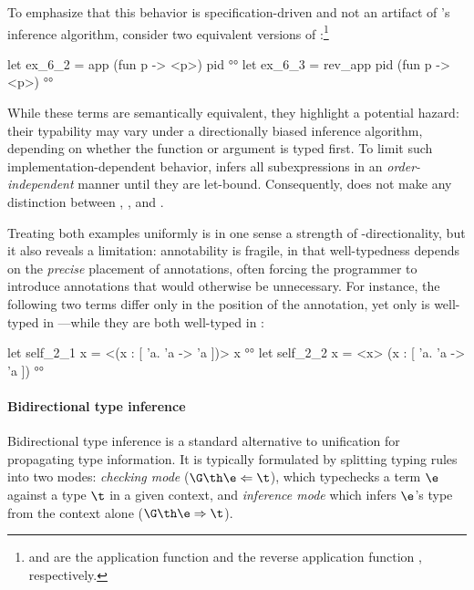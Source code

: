 \documentclass[acmsmall,screen,nonacm%
\Anonymous{,anonymous}{}%
\Final{}{,review}%
]{acmart}
\providecommand{\DIFdel}[1]{\protect\cbdelete{\protect\color{red}#1}\protect\cbdelete} %
\providecommand{\DIFaddbegin}{} %
\providecommand{\DIFaddend}{} %
\providecommand{\DIFdelbegin}{} %
\providecommand{\DIFdelend}{} %
\begin{document}
To emphasize that this behavior is specification-driven and not an artifact of
\OCaml's inference algorithm, consider two equivalent versions of
:\footnote {\let \code \Code
\code{app} and \code{rev_app} are the application
function  and the reverse application function
, respectively.}
\begin{program}
let ex_6_2 = app (fun p -> <p>) pid                        °°
let ex_6_3 = rev_app pid (fun p -> <p>)                    °°
\end{program}
While these terms are semantically equivalent, they highlight a potential
hazard: their typability may vary under a directionally biased inference
algorithm, depending on whether the function or argument is typed first.  To
limit such implementation-dependent behavior, \OCaml infers all
subexpressions in an \emph{order-independent} manner until they are let-bound.
Consequently, \OCaml does not make any distinction between
, , and .


Treating both examples uniformly is in one sense a strength of
\geninst-directionality, but it also reveals a limitation:
annotability is fragile, in that well-typedness depends on the
\emph{precise} placement of annotations, often forcing the programmer
to introduce annotations that would otherwise be unnecessary.
For instance, the following two terms differ only in the position of
the annotation, yet only \DIFdelbegin \DIFdel{the one on the left-hand side }\DIFdelend \DIFaddbegin {} \DIFaddend is well-typed in
\OCaml---while they are both well-typed in \OML:
\begin{program}
let self_2_1 x = <(x : [ 'a. 'a -> 'a ])> x °°
let self_2_2 x = <x> (x : [ 'a. 'a -> 'a ]) °°
\end{program}

\paragraph{Bidirectional type inference}

Bidirectional type inference is a standard alternative to unification for
propagating type information. It is typically formulated by splitting typing
rules into two modes: \emph{checking mode} ($\G \th \e \Leftarrow \t$), which
typechecks a term $\e$ against a type $\t$ in a given context, and
\emph{inference mode} which infers $\e$'s type from the context alone ($\G \th \e
\Rightarrow \t$).
\end{document}
